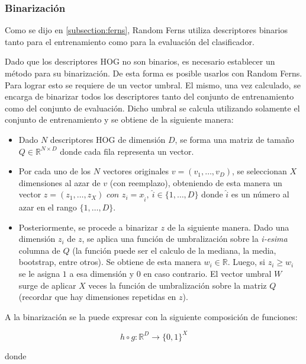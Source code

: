 	
\subsubsection{Binarización}
\label{subsubsection:binarizacion}
	
		Como se dijo en \ref{subsection:ferns}, Random Ferns utiliza descriptores binarios tanto para el entrenamiento como para la evaluación del clasificador.
		
		Dado que los descriptores HOG no son binarios, es necesario establecer un método para su binarización. De esta forma es posible usarlos con Random Ferns. Para lograr esto se requiere de un vector umbral. El mismo, una vez  calculado, se encarga de binarizar todos los descriptores tanto del conjunto de entrenamiento como del conjunto de evaluación. Dicho umbral se calcula utilizando solamente el conjunto de entrenamiento y se obtiene de la siguiente manera:
		
		\begin{itemize}
		
			\item Dado $N$ descriptores HOG de dimensión $D$, se forma una matriz de tamaño $Q \in \mathbb{R}^{N \times D}$ donde cada fila representa un vector.
			\item Por cada uno de los $N$ vectores originales $v=(v_1,\dots,v_D)$, se seleccionan $X$ dimensiones al azar de $v$ (con reemplazo), obteniendo de esta manera un vector $z = (z_1,\dots,z_X) \textit{ con } z_i=x_{\hat{i}},~\hat{i} \in \{1,\dots,D\}$ donde $\hat{i}$ es un número al azar en el rango $\{1,\dots,D\}$.
			\item Posteriormente, se procede a binarizar $z$ de la siguiente manera. Dado una dimensión $z_i$ de $z$, se aplica una función de umbralización sobre la \textit{i-esima} columna de $Q$ (la función puede ser el calculo de la mediana, la media, bootstrap, entre otros). Se obtiene de esta manera $w_i \in \mathbb{R}$. Luego, si $z_i \geq w_i$ se le asigna $1$ a esa dimensión y $0$ en caso contrario. El vector umbral $W$ surge de aplicar $X$ veces la función de umbralización sobre la matriz $Q$ (recordar que hay dimensiones repetidas en $z$).
						
		\end{itemize}
	
	A la binarización se la puede expresar con la siguiente composición de funciones:
	
	$$h \circ g:\mathbb{R}^{D} \rightarrow \{ 0, 1\}^{X}$$
	
	donde
	
